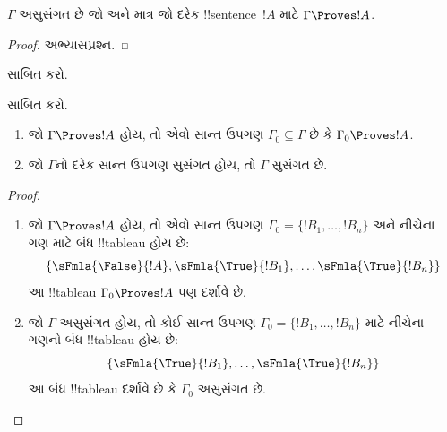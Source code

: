 \documentclass[../../../include/open-logic-section]{subfiles}
\begin{document}
\begin{prop}
$\Gamma$ અસુસંગત છે જો અને માત્ર જો દરેક !!{sentence}~$!A$ માટે
$\Gamma \Proves !A$.
\end{prop}

\begin{proof}
અભ્યાસપ્રશ્ન.
\end{proof}

\begin{prob}
 સાબિત કરો.
\end{prob}
\tagendprob

\begin{prob}
 સાબિત કરો.
\end{prob}
\tagendprob

\begin{prop}[સઘનતા]
  \begin{enumerate}
  \item જો $\Gamma \Proves !A$ હોય, તો એવો સાન્ત ઉપગણ
    $\Gamma_0 \subseteq \Gamma$ છે કે $\Gamma_0 \Proves !A$.
  \item જો $\Gamma$નો દરેક સાન્ત ઉપગણ સુસંગત હોય, તો $\Gamma$ સુસંગત છે.
  \end{enumerate}
\end{prop}

\begin{proof}
  \begin{enumerate}
    \item જો $\Gamma \Proves !A$ હોય, તો એવો સાન્ત ઉપગણ
      $\Gamma_0 = \{!B_1, \dots, !B_n\}$ અને નીચેના ગણ માટે બંધ
      !!{tableau} હોય છે:
      \[
      \{\sFmla{\False}{!A}, \sFmla{\True}{!B_1}, \dots, \sFmla{\True}{!B_n}\}
      \]
      આ !!{tableau} $\Gamma_0 \Proves !A$ પણ દર્શાવે છે.
    \item જો $\Gamma$ અસુસંગત હોય, તો કોઈ સાન્ત ઉપગણ
      $\Gamma_0 = \{!B_1, \dots, !B_n\}$ માટે નીચેના ગણનો બંધ
      !!{tableau} હોય છે:
      \[
      \{\sFmla{\True}{!B_1}, \dots, \sFmla{\True}{!B_n}\}
      \]
      આ બંધ !!{tableau} દર્શાવે છે કે $\Gamma_0$ અસુસંગત છે.
  \end{enumerate}
\end{proof}
\end{document}
